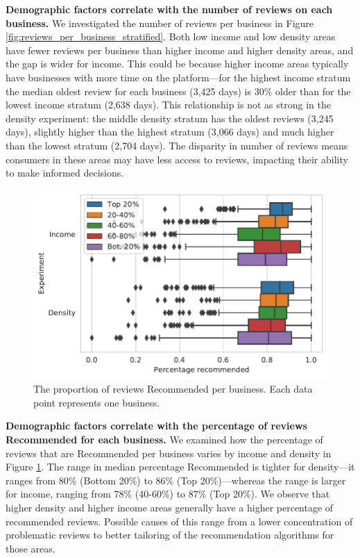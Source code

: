 \textbf{Demographic factors correlate with the number of reviews on each business.} We investigated the number of reviews per business in Figure \ref{fig:reviews_per_business_stratified}. Both low income and low density areas have fewer reviews per business than higher income and higher density areas, and the gap is wider for income. This could be because higher income areas typically have businesses with more time on the platform---for the highest income stratum the median oldest review for each business (3,425 days) is 30\% older than for the lowest income stratum (2,638 days). This relationship is not as strong in the density experiment: the middle density stratum has the oldest reviews (3,245 days), slightly higher than the highest stratum (3,066 days) and much higher than the lowest stratum (2,704 days). The disparity in number of reviews means consumers in these areas may have less access to reviews, impacting their ability to make informed decisions.

 \begin{figure}[t]
     \centering
     \includegraphics[width=0.9\columnwidth]{chapters/reviews/figures/percentage_recommended_per_businesses_extended.pdf}
     \caption[The proportion of reviews Recommended per business]{The proportion of reviews Recommended per business. Each data point represents one business.}
     \label{fig:percentage_recommended_per_businesses_extended}
 \end{figure}
 
\textbf{Demographic factors correlate with the percentage of reviews Recommended for each business.} We examined how the percentage of reviews that are Recommended per business varies by income and density in Figure \ref{fig:percentage_recommended_per_businesses_extended}. The range in median percentage Recommended is tighter for density---it ranges from 80\% (Bottom 20\%) to 86\% (Top 20\%)---whereas the range is larger for income, ranging from 78\% (40-60\%) to 87\% (Top 20\%). We observe that higher density and higher income areas generally have a higher percentage of recommended reviews. Possible causes of this range from a lower concentration of problematic reviews to better tailoring of the recommendation algorithms for those areas.

